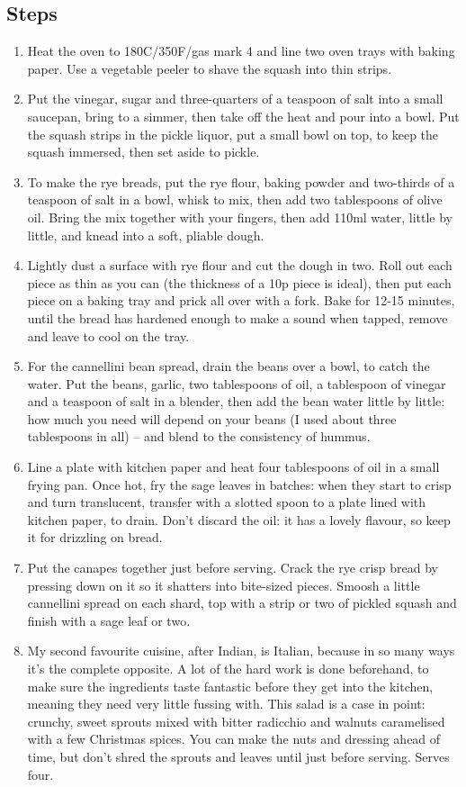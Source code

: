 \documentclass{book}
\begin{document}
\subsection*{Steps}
\begin{enumerate}
\item Heat the oven to 180C/350F/gas mark 4 and line two oven trays with baking paper. Use a vegetable peeler to shave the squash into thin strips.
\item Put the vinegar, sugar and three-quarters of a teaspoon of salt into a small saucepan, bring to a simmer, then take off the heat and pour into a bowl. Put the squash strips in the pickle liquor, put a small bowl on top, to keep the squash immersed, then set aside to pickle.
\item To make the rye breads, put the rye flour, baking powder and two-thirds of a teaspoon of salt in a bowl, whisk to mix, then add two tablespoons of olive oil. Bring the mix together with your fingers, then add 110ml water, little by little, and knead into a soft, pliable dough.
\item Lightly dust a surface with rye flour and cut the dough in two. Roll out each piece as thin as you can (the thickness of a 10p piece is ideal), then put each piece on a baking tray and prick all over with a fork. Bake for 12-15 minutes, until the bread has hardened enough to make a sound when tapped, remove and leave to cool on the tray.
\item For the cannellini bean spread, drain the beans over a bowl, to catch the water. Put the beans, garlic, two tablespoons of oil, a tablespoon of vinegar and a teaspoon of salt in a blender, then add the bean water little by little: how much you need will depend on your beans (I used about three tablespoons in all) – and blend to the consistency of hummus.
\item Line a plate with kitchen paper and heat four tablespoons of oil in a small frying pan. Once hot, fry the sage leaves in batches: when they start to crisp and turn translucent, transfer with a slotted spoon to a plate lined with kitchen paper, to drain. Don’t discard the oil: it has a lovely flavour, so keep it for drizzling on bread.
\item Put the canapes together just before serving. Crack the rye crisp bread by pressing down on it so it shatters into bite-sized pieces. Smoosh a little cannellini spread on each shard, top with a strip or two of pickled squash and finish with a sage leaf or two.
\item My second favourite cuisine, after Indian, is Italian, because in so many ways it’s the complete opposite. A lot of the hard work is done beforehand, to make sure the ingredients taste fantastic before they get into the kitchen, meaning they need very little fussing with. This salad is a case in point: crunchy, sweet sprouts mixed with bitter radicchio and walnuts caramelised with a few Christmas spices. You can make the nuts and dressing ahead of time, but don’t shred the sprouts and leaves until just before serving. Serves four.

\end{enumerate}
\end{document}
